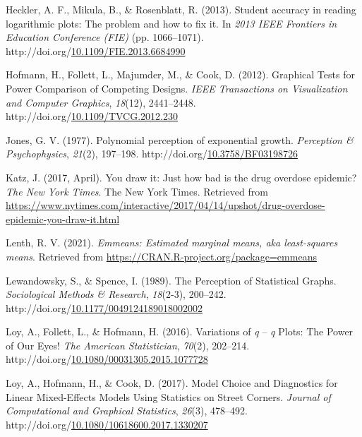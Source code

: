 \documentclass[print]{nuthesis}
\newlength{\cslhangindent}
\newenvironment{CSLReferences}%
{\setlength{\parindent}{0pt}%
\everypar{\setlength{\hangindent}{\cslhangindent}}\ignorespaces}%
{\par}
\begin{document}
\begin{CSLReferences}{1}{0}
\leavevmode\hypertarget{ref-heckler_student_2013}{}%
Heckler, A. F., Mikula, B., \& Rosenblatt, R. (2013). Student accuracy in reading logarithmic plots: {The} problem and how to fix it. In \emph{2013 {IEEE} {Frontiers} in {Education} {Conference} ({FIE})} (pp. 1066--1071). http://doi.org/\href{https://doi.org/10.1109/FIE.2013.6684990}{10.1109/FIE.2013.6684990}

\leavevmode\hypertarget{ref-hofmann_graphical_2012}{}%
Hofmann, H., Follett, L., Majumder, M., \& Cook, D. (2012). Graphical {Tests} for {Power} {Comparison} of {Competing} {Designs}. \emph{IEEE Transactions on Visualization and Computer Graphics}, \emph{18}(12), 2441--2448. http://doi.org/\href{https://doi.org/10.1109/TVCG.2012.230}{10.1109/TVCG.2012.230}

\leavevmode\hypertarget{ref-jones_polynomial_1977}{}%
Jones, G. V. (1977). Polynomial perception of exponential growth. \emph{Perception \& Psychophysics}, \emph{21}(2), 197--198. http://doi.org/\href{https://doi.org/10.3758/BF03198726}{10.3758/BF03198726}

\leavevmode\hypertarget{ref-katz_2017}{}%
Katz, J. (2017, April). You draw it: Just how bad is the drug overdose epidemic? \emph{The New York Times}. The New York Times. Retrieved from \url{https://www.nytimes.com/interactive/2017/04/14/upshot/drug-overdose-epidemic-you-draw-it.html}

\leavevmode\hypertarget{ref-emmeans}{}%
Lenth, R. V. (2021). \emph{Emmeans: Estimated marginal means, aka least-squares means}. Retrieved from \url{https://CRAN.R-project.org/package=emmeans}

\leavevmode\hypertarget{ref-lewandowsky_perception_1989}{}%
Lewandowsky, S., \& Spence, I. (1989). The {Perception} of {Statistical} {Graphs}. \emph{Sociological Methods \& Research}, \emph{18}(2-3), 200--242. http://doi.org/\href{https://doi.org/10.1177/0049124189018002002}{10.1177/0049124189018002002}

\leavevmode\hypertarget{ref-loy_variations_2016}{}%
Loy, A., Follett, L., \& Hofmann, H. (2016). Variations of \emph{q} -- \emph{q} {Plots}: {The} {Power} of {Our} {Eyes}! \emph{The American Statistician}, \emph{70}(2), 202--214. http://doi.org/\href{https://doi.org/10.1080/00031305.2015.1077728}{10.1080/00031305.2015.1077728}

\leavevmode\hypertarget{ref-loy_model_2017}{}%
Loy, A., Hofmann, H., \& Cook, D. (2017). Model {Choice} and {Diagnostics} for {Linear} {Mixed}-{Effects} {Models} {Using} {Statistics} on {Street} {Corners}. \emph{Journal of Computational and Graphical Statistics}, \emph{26}(3), 478--492. http://doi.org/\href{https://doi.org/10.1080/10618600.2017.1330207}{10.1080/10618600.2017.1330207}


\end{CSLReferences}
\end{document}

